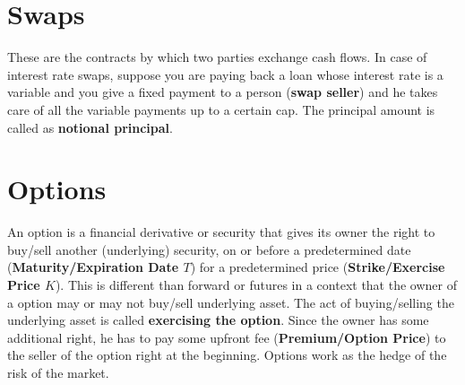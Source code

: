 \section{Swaps}
These are the contracts by which two parties exchange cash flows. In case of interest rate swaps, suppose you are paying back a loan whose interest rate is a variable and you give a fixed payment to a person (\textbf{swap seller}) and he takes care of all the variable payments up to a certain cap. The principal amount is called as \textbf{notional principal}.
\section{Options}
An option is a financial derivative or security that gives its owner the right to buy/sell another (underlying) security, on or before a predetermined date (\textbf{Maturity/Expiration Date $T$}) for a predetermined price (\textbf{Strike/Exercise Price $K$}). This is different than forward or futures in a context that the owner of a option may or may not buy/sell underlying asset. The act of buying/selling the underlying asset is called \textbf{exercising the option}. Since the owner has some additional right, he has to pay some upfront fee (\textbf{Premium/Option Price}) to the seller of the option right at the beginning. Options work as the hedge of the risk of the market.

